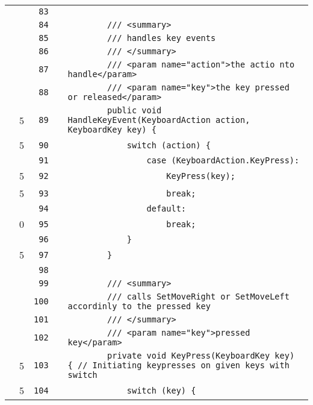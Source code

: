\documentclass[a4paper,landscape,10pt]{article}
\begin{document}
\begin{longtable}[l]{lrrll}
\cellcolor{gray} &  & \verb~83~ & & \verb~~\\
\cellcolor{gray} &  & \verb~84~ & & \verb~        /// <summary>~\\
\cellcolor{gray} &  & \verb~85~ & & \verb~        /// handles key events~\\
\cellcolor{gray} &  & \verb~86~ & & \verb~        /// </summary>~\\
\cellcolor{gray} &  & \verb~87~ & & \verb~        /// <param name="action">the actio nto handle</param>~\\
\cellcolor{gray} &  & \verb~88~ & & \verb~        /// <param name="key">the key pressed or released</param>~\\
\cellcolor{green} & 5 & \verb~89~ & & \verb~        public void HandleKeyEvent(KeyboardAction action, KeyboardKey key) {~\\
\cellcolor{green} & 5 & \verb~90~ & & \verb~            switch (action) {~\\
\cellcolor{gray} &  & \verb~91~ & & \verb~                case (KeyboardAction.KeyPress):~\\
\cellcolor{green} & 5 & \verb~92~ & & \verb~                    KeyPress(key);~\\
\cellcolor{green} & 5 & \verb~93~ & & \verb~                    break;~\\
\cellcolor{gray} &  & \verb~94~ & & \verb~                default:~\\
\cellcolor{red} & 0 & \verb~95~ & & \verb~                    break;~\\
\cellcolor{gray} &  & \verb~96~ & & \verb~            }~\\
\cellcolor{green} & 5 & \verb~97~ & & \verb~        }~\\
\cellcolor{gray} &  & \verb~98~ & & \verb~~\\
\cellcolor{gray} &  & \verb~99~ & & \verb~        /// <summary>~\\
\cellcolor{gray} &  & \verb~100~ & & \verb~        /// calls SetMoveRight or SetMoveLeft accordinly to the pressed key~\\
\cellcolor{gray} &  & \verb~101~ & & \verb~        /// </summary>~\\
\cellcolor{gray} &  & \verb~102~ & & \verb~        /// <param name="key">pressed key</param>~\\
\cellcolor{green} & 5 & \verb~103~ & & \verb~        private void KeyPress(KeyboardKey key) { // Initiating keypresses on given keys with switch~\\
\cellcolor{green} & 5 & \verb~104~ & & \verb~            switch (key) {~\\

\end{longtable}
\end{document}
